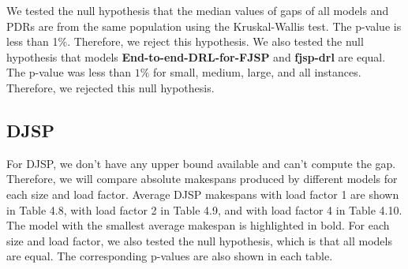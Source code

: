We tested the null hypothesis that the median values of gaps of all models and PDRs are from the same population using the Kruskal-Wallis test. The p-value is less than 1$\%$. Therefore, we reject this hypothesis. We also tested the null hypothesis that models \textbf{End-to-end-DRL-for-FJSP} and \textbf{fjsp-drl} are equal. The p-value was less than $1\%$ for small, medium, large, and all instances. Therefore, we rejected this null hypothesis.

\subsection{DJSP}

For DJSP, we don't have any upper bound available and can't compute the gap. Therefore, we will compare absolute makespans produced by different models for each size and load factor. Average DJSP makespans with load factor 1 are shown in Table 4.8, with load factor 2 in Table 4.9, and with load factor 4 in Table 4.10. The model with the smallest average makespan is highlighted in bold. For each size and load factor, we also tested the null hypothesis, which is that all models are equal. The corresponding p-values are also shown in each table.

